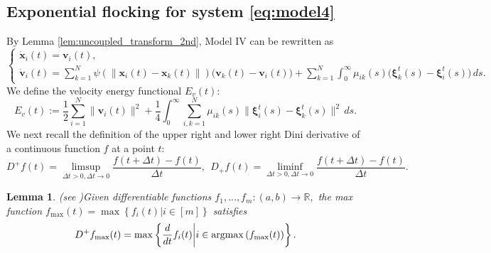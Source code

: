 \documentclass[11pt]{amsart}
\newtheorem{lemma}{Lemma}[section]
\newtheorem{remark}{Remark}[section]
\numberwithin{equation}{section}
\newcommand{\R}{\mathbb R}
\begin{document}
\subsection{Exponential flocking for system \eqref{eq:model4}}
By Lemma \ref{lem:uncoupled_transform_2nd}, Model IV can be rewritten as
{\small
\begin{equation}\label{eq:model4_auto}
\begin{cases}
\dot{\boldsymbol{x}}_i(t) = \boldsymbol{v}_i(t), \\[4pt]
\dot{\boldsymbol{v}}_i(t) = \displaystyle\sum_{k=1}^{N} \psi(\|\boldsymbol{x}_i(t)-\boldsymbol{x}_k(t)\|)\bigl(\boldsymbol{v}_k(t)-\boldsymbol{v}_i(t)\bigr) + \sum_{k=1}^{N} \int_0^\infty \mu_{ik}(s)\bigl(\boldsymbol{\xi}_k^t(s)-\boldsymbol{\xi}_i^t(s)\bigr)\,ds.
\end{cases}
\end{equation}
}
We define the velocity energy functional $E_v(t)$:
\begin{equation}\label{eq:Ev}
E_v(t) := \frac12\sum_{i=1}^N\|\boldsymbol{v}_i(t)\|^2 + \frac14\int_0^\infty\sum_{i,k=1}^N \mu_{ik}(s)\|\boldsymbol{\xi}_i^t(s)-\boldsymbol{\xi}_k^t(s)\|^2\,ds.
\end{equation}
We next recall the definition of the upper right and lower right Dini derivative of a continuous function $f$ at a point $t$:
\begin{equation*}\label{dini}
D^+f(t)=\underset{\Delta t>0,\Delta t\rightarrow0}{\limsup}\frac{f\left(t+\Delta t\right)-f(t)}{\Delta t},~~D_+f(t)=\underset{\Delta t>0,\Delta t\rightarrow0}{\liminf}\frac{f\left(t+\Delta t\right)-f(t)}{\Delta t}.
\end{equation*}
\begin{lemma}{\rm (see \cite[Lemma 15.17]{dini-2})}\label{dini-1}
Given differentiable functions $f_1,...,f_m:(a,b)\rightarrow\R,$ the max function $f_{\max}(t)=\max\left\{f_i(t)|i\in[m]\right\}$ satisfies
$$
D^+f_{\max}(t)=\max\left\{\frac{d}{dt}f_i(t)\bigg|i\in {\rm argmax}\left(f_{\max}(t)\right)\right\}.
$$
\end{lemma}

\end{document}
